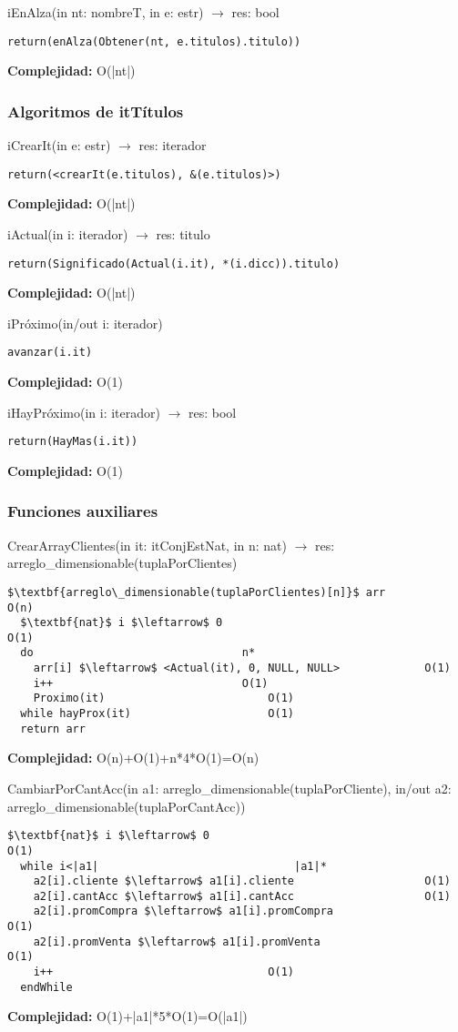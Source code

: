 iEnAlza(in nt: nombreT, in e: estr) $\rightarrow$ res: bool
\begin{lstlisting}[mathescape]
  return(enAlza(Obtener(nt, e.titulos).titulo))
\end{lstlisting}
\textbf{Complejidad:} O(|nt|)



\subsubsection{Algoritmos de itT\'itulos}

iCrearIt(in e: estr) $\rightarrow$ res: iterador
\begin{lstlisting}[mathescape]
  return(<crearIt(e.titulos), &(e.titulos)>)
\end{lstlisting}
\textbf{Complejidad:} O(|nt|)

iActual(in i: iterador) $\rightarrow$ res: titulo
\begin{lstlisting}[mathescape]
  return(Significado(Actual(i.it), *(i.dicc)).titulo)
\end{lstlisting}
\textbf{Complejidad:} O(|nt|)

iPr\'oximo(in/out i: iterador)
\begin{lstlisting}[mathescape]
  avanzar(i.it)
\end{lstlisting}
\textbf{Complejidad:} O(1)

iHayPr\'oximo(in i: iterador) $\rightarrow$ res: bool
\begin{lstlisting}[mathescape]
  return(HayMas(i.it))
\end{lstlisting}
\textbf{Complejidad:} O(1)



\subsubsection{Funciones auxiliares}
CrearArrayClientes(in it: itConjEstNat, in n: nat) $\rightarrow$ res: arreglo\_dimensionable(tuplaPorClientes)
\begin{lstlisting}[mathescape]
  $\textbf{arreglo\_dimensionable(tuplaPorClientes)[n]}$ arr					O(n)
  $\textbf{nat}$ i $\leftarrow$ 0									O(1)
  do								n*
    arr[i] $\leftarrow$ <Actual(it), 0, NULL, NULL>				O(1)
    i++								O(1)
    Proximo(it)							O(1)
  while hayProx(it)						O(1)
  return arr
\end{lstlisting}
\textbf{Complejidad:} O(n)+O(1)+n*4*O(1)=O(n)

CambiarPorCantAcc(in a1: arreglo\_dimensionable(tuplaPorCliente), in/out a2: arreglo\_dimensionable(tuplaPorCantAcc))
\begin{lstlisting}[mathescape]
  $\textbf{nat}$ i $\leftarrow$ 0										O(1)
  while i<|a1|								|a1|*
    a2[i].cliente $\leftarrow$ a1[i].cliente					O(1)
    a2[i].cantAcc $\leftarrow$ a1[i].cantAcc					O(1)
    a2[i].promCompra $\leftarrow$ a1[i].promCompra					O(1)
    a2[i].promVenta $\leftarrow$ a1[i].promVenta					O(1)
    i++									O(1)
  endWhile
\end{lstlisting}
\textbf{Complejidad:} O(1)+|a1|*5*O(1)=O(|a1|)

